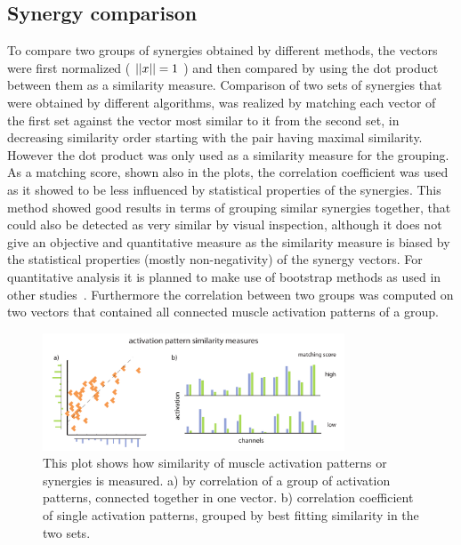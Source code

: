 \subsection{Synergy comparison} %
\label{sg:sub:comp}
To compare two groups of synergies obtained by different methods, the vectors were first normalized ( $\left|\left|x\right|\right| = 1$ ) and then compared by using the dot product between them as a similarity measure. Comparison of two sets of synergies that were obtained by different algorithms, was realized by matching each vector of the first set against the vector most similar to it from the second set, in decreasing similarity order starting with the pair having maximal similarity. However the dot product was only used as a similarity measure for the grouping. As a matching score, shown also in the plots, the correlation coefficient was used as it showed to be less influenced by statistical properties of the synergies. This method showed good results in terms of grouping similar synergies together, that could also be detected as very similar by visual inspection, although it does not give an objective and quantitative measure as the similarity measure is biased by the statistical properties (mostly non-negativity) of the synergy vectors. For quantitative analysis it is planned to make use of bootstrap methods as used in other studies~\citet{AdAvella:2005p2330}. Furthermore the correlation between two groups was computed on two vectors that contained all connected muscle activation patterns of a group.
\begin{figure}[ht]
	\centering
		\includegraphics[width=0.8\textwidth]{images/match_explanation.pdf}
	\caption{This plot shows how similarity of muscle activation patterns or synergies is measured. a) by correlation of a group of activation patterns, connected together in one vector. b) correlation coefficient of single activation patterns, grouped by best fitting similarity in the two sets. }
	\label{sg:fig:images_match_explanation}
\end{figure}

